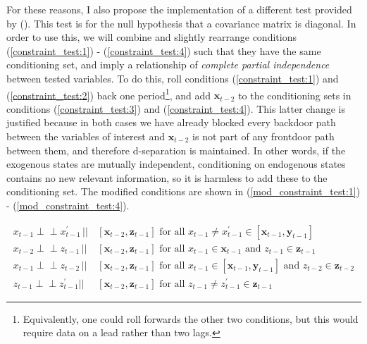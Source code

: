 \documentclass{article}
\def\indep{\perp \!\!\! \perp}
\begin{document}
For these reasons, I also propose the implementation of a different test provided by \citeauthor{srivastava2005some} (\citeyear{srivastava2005some}). This test is for the null hypothesis that a covariance matrix is diagonal. In order to use this, we will combine and slightly rearrange conditions (\ref{constraint_test:1}) - (\ref{constraint_test:4}) such that they have the same conditioning set, and imply a relationship of \textit{complete partial independence} between tested variables. To do this, roll conditions (\ref{constraint_test:1}) and (\ref{constraint_test:2}) back one period\footnote{Equivalently, one could roll forwards the other two conditions, but this would require data on a lead rather than two lags.}, and add $\mathbf{x}_{t-2}$ to the conditioning sets in conditions (\ref{constraint_test:3}) and (\ref{constraint_test:4}). This latter change is justified because in both cases we have already blocked every backdoor path between the variables of interest and $\mathbf{x}_{t-2}$ is not part of any frontdoor path between them, and therefore d-separation is maintained. In other words, if the exogenous states are mutually independent, conditioning on endogenous states contains no new relevant information, so it is harmless to add these to the conditioning set. The modified conditions are shown in (\ref{mod_constraint_test:1}) - (\ref{mod_constraint_test:4}).

\begin{align}
  x_{t-1} \indep x^{\prime}_{t-1} \,||\,& [\mathbf{x}_{t-2},\mathbf{z}_{t-1}] \text{ for all } x_{t-1} \neq x^{\prime}_{t-1} \in [\mathbf{x}_{t-1}, \mathbf{y}_{t-1}] \label{mod_constraint_test:1} \\
  x_{t-2} \indep z_{t-1} \,||\,& [\mathbf{x}_{t-2},\mathbf{z}_{t-1}] \text{ for all } x_{t-1} \in \mathbf{x}_{t-1} \text{ and } z_{t-1} \in \mathbf{z}_{t-1} \label{mod_constraint_test:3} \\
  x_{t-1} \indep z_{t-2} \,||\,& [\mathbf{x}_{t-2},\mathbf{z}_{t-1}] \text{ for all } x_{t-1} \in [\mathbf{x}_{t-1}, \mathbf{y}_{t-1}] \text{ and } z_{t-2} \in \mathbf{z}_{t-2} \label{mod_constraint_test:2} \\
  z_{t-1} \indep z^{\prime}_{t-1} || & [\mathbf{x}_{t-2},\mathbf{z}_{t-1}] \text{ for all } z_{t-1} \not = z^{\prime}_{t-1} \in \mathbf{z}_{t-1} \label{mod_constraint_test:4}
\end{align}
\end{document}
